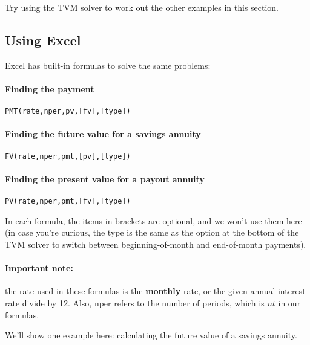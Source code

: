 \begin{try}
Try using the TVM solver to work out the other examples in this section.
\end{try}
\vfill
\pagebreak

\subsection{Using Excel}
Excel has built-in formulas to solve the same problems:
\paragraph{Finding the payment} \texttt{PMT(rate,nper,pv,[fv],[type])}
\paragraph{Finding the future value for a savings annuity} \texttt{FV(rate,nper,pmt,[pv],[type])}
\paragraph{Finding the present value for a payout annuity} \texttt{PV(rate,nper,pmt,[fv],[type])}

In each formula, the items in brackets are optional, and we won't use them here (in case you're curious, the type is the same as the option at the bottom of the TVM solver to switch between beginning-of-month and end-of-month payments).\\

\paragraph{Important note:} the rate used in these formulas is the \textbf{monthly} rate, or the given annual interest rate divide by 12.  Also, nper refers to the number of periods, which is $nt$ in our formulas.

We'll show one example here: calculating the future value of a savings annuity.

